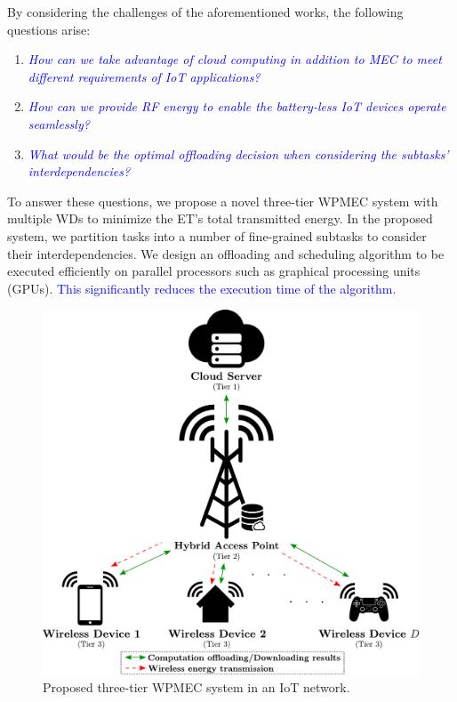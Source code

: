 \documentclass[12pt,draftclsnofoot,onecolumn]{IEEEtran}
\begin{document}
By considering the challenges of the aforementioned works, the following questions arise:
\begin{enumerate}
	\item \textcolor{blue}{\textit{How can we take advantage of cloud computing in addition to MEC to meet different requirements of IoT applications?}}
	\item \textcolor{blue}{\textit{How can we provide RF energy to enable the battery-less IoT devices operate seamlessly?}}
	\item \textcolor{blue}{\textit{What would be the optimal offloading decision when considering the subtasks' interdependencies?}}
\end{enumerate}

To answer these questions, we propose a novel three-tier WPMEC system with multiple WDs to minimize the ET's total transmitted energy. In the proposed system, we partition tasks into a number of fine-grained subtasks to consider their interdependencies. We design an offloading and scheduling algorithm to be executed efficiently on parallel processors such as graphical processing units (GPUs). \textcolor{blue}{This significantly reduces the execution time of the algorithm.}

\begin{figure}
	\centering
	\includegraphics[width=.33\textwidth]{system_model.pdf}
	\caption{Proposed three-tier WPMEC system in an IoT network.}\label{fig1}
\end{figure}
\end{document}
